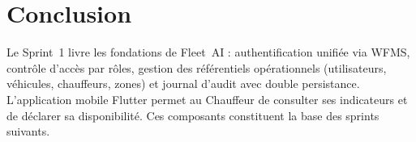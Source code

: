 \section*{Conclusion}

Le Sprint~1 livre les fondations de Fleet~AI : authentification unifiée via WFMS, contrôle d'accès par rôles, gestion des référentiels opérationnels (utilisateurs, véhicules, chauffeurs, zones) et journal d'audit avec double persistance. L'application mobile Flutter permet au Chauffeur de consulter ses indicateurs et de déclarer sa disponibilité. Ces composants constituent la base des sprints suivants.
